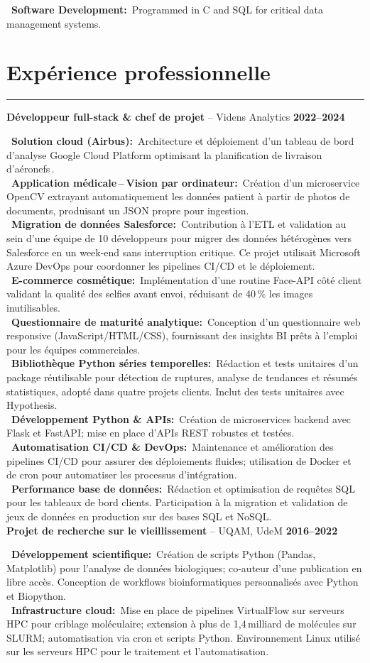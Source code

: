 \documentclass[a4paper,10pt]{article}
\newif\ifpandocconvert
\newcommand{\resumeSection}[2]{%
  \ifpandocconvert %
    \par\addvspace{1em}\noindent\textbf{#1}\par\addvspace{0.5em}%
    #2%
    \par\addvspace{0.3em}%
  \else %
    \section*{#1}%
    \vspace{-2em} %
    \noindent\rule{\textwidth}{0.4pt}%
    \vspace{0.5em} %
    #2%
    \vspace{0.3em}%
  \fi
}
\newcommand{\resumeItem}[3]{%
  \noindent\textbf{#1} -- #2 \hfill \textbf{#3} \\
  \vspace{0.3em}
}
\newcommand{\jobItem}[2]{%
  \noindent
  \textbullet\ \textbf{#1\ifthenelse{\boolean{EN}}{}{ }:}~#2\vspace{0.3em} \\
}
\begin{document}
{{    \jobItem{Software Development}{Programmed in C and SQL for critical data management systems.}
  }
}{%
  \resumeSection{Expérience professionnelle}{
    \resumeItem{Développeur full-stack \& chef de projet}{Videns Analytics}{2022–2024}
    \jobItem{Solution cloud (Airbus)}{Architecture et déploiement d'un tableau de bord d'analyse Google Cloud Platform optimisant la planification de livraison d'aéronefs .}
    \jobItem{Application médicale – Vision par ordinateur}{Création d'un microservice OpenCV extrayant automatiquement les données patient à partir de photos de documents, produisant un JSON propre pour ingestion.}
    \jobItem{Migration de données Salesforce}{Contribution à l'ETL et validation au sein d'une équipe de 10 développeurs pour migrer des données hétérogènes vers Salesforce en un week-end sans interruption critique. Ce projet utilisait Microsoft Azure DevOps pour coordonner les pipelines CI/CD et le déploiement.}
    \jobItem{E-commerce cosmétique}{Implémentation d'une routine Face-API côté client validant la qualité des selfies avant envoi, réduisant de 40\,\% les images inutilisables.}
    \jobItem{Questionnaire de maturité analytique}{Conception d'un questionnaire web responsive (JavaScript/HTML/CSS), fournissant des insights BI prêts à l'emploi pour les équipes commerciales.}
    \jobItem{Bibliothèque Python séries temporelles}{Rédaction et tests unitaires d'un package réutilisable pour détection de ruptures, analyse de tendances et résumés statistiques, adopté dans quatre projets clients. Inclut des tests unitaires avec Hypothesis.}
    \jobItem{Développement Python \& APIs}{Création de microservices backend avec Flask et FastAPI; mise en place d’APIs REST robustes et testées.}
    \jobItem{Automatisation CI/CD \& DevOps}{Maintenance et amélioration des pipelines CI/CD pour assurer des déploiements fluides; utilisation de Docker et de cron pour automatiser les processus d’intégration.}
    \jobItem{Performance base de données}{Rédaction et optimisation de requêtes SQL pour les tableaux de bord clients. Participation à la migration et validation de jeux de données en production sur des bases SQL et NoSQL.}
    \vspace{1em}
    \resumeItem{Projet de recherche sur le vieillissement}{UQAM, UdeM}{2016–2022}
    \jobItem{Développement scientifique}{Création de scripts Python (Pandas, Matplotlib) pour l'analyse de données biologiques; co-auteur d’une publication en libre accès. Conception de workflows bioinformatiques personnalisés avec Python et Biopython.}
    \jobItem{Infrastructure cloud}{Mise en place de pipelines VirtualFlow sur serveurs HPC pour criblage moléculaire; extension à plus de 1,4 milliard de molécules sur SLURM; automatisation via cron et scripts Python. Environnement Linux utilisé sur les serveurs HPC pour le traitement et l'automatisation.}
}}
\end{document}
